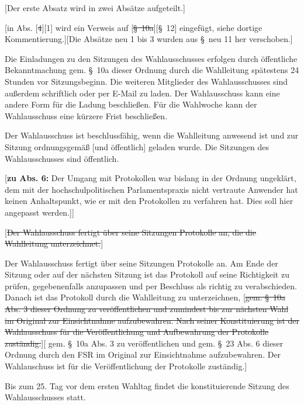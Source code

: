 \documentclass[%
draft,%
multilinesections%
]{fswo}
\newcommand\oldT[1]  {{\color{Gray}[\st{#1}]}}
\newcommand\newT[1]  {{\color{Green}[#1]}}
\newcommand\bemFr[1] {{\color{Red}[#1]}}
\newcommand\bemFe[1] {{\color{Cyan}[#1]}}
\newcommand\oldT[1]{}%
\newcommand\newT[1]{#1}
\newcommand\bemFr[1]{}%
\newcommand\bemFe[1]{}%
\newcommand\change[2]{\oldT{#1}\newT{#2}}
\begin{document}
\bemFe{Der erste Absatz wird in zwei Absätze aufgeteilt.}
\begin{contract}
\begin{addmargin}{1cm}
\bemFr{in Abs. \change{4}{1} wird ein Verweis auf \change{\S~10a}{\S~12} eingefügt, siehe dortige Kommentierung.}\bemFe{Die Absätze neu 1 bis 3 wurden aus \S~neu 11 her verschoben.}
\end{addmargin}

Die Einladungen zu den Sitzungen des Wahlausschusses erfolgen durch öffentliche Bekanntmachung gem. \S~10a dieser Ordnung durch die Wahlleitung spätestens 24 Stunden vor Sitzungsbeginn.
Die weiteren Mitglieder des Wahlausschusses sind außerdem schriftlich oder per E-Mail zu laden.
Der Wahlausschuss kann eine andere Form für die Ladung beschließen.
Für die Wahlwoche kann der Wahlausschuss eine kürzere Frist beschließen.

Der Wahlausschuss ist beschlussfähig, wenn die Wahlleitung anwesend ist und zur Sitzung ordnungsgemäß \newT{und öffentlich} geladen wurde.
Die Sitzungen des Wahlausschusses sind öffentlich.
%
\begin{addmargin}{1cm}
\bemFr{\textbf{zu Abs. 6:}
Der Umgang mit Protokollen war bislang in der Ordnung ungeklärt,
dem mit der hochschulpolitischen Parlamentspraxis nicht vertraute Anwender hat keinen Anhaltspunkt, wie er mit den Protokollen zu verfahren hat.
Dies soll hier angepasst werden.]}
\end{addmargin}
%
\oldT{Der Wahlausschuss fertigt über seine Sitzungen Protokolle an, die die Wahlleitung unterzeichnet.}

Der Wahlausschuss fertigt über seine Sitzungen Protokolle an.
Am Ende der Sitzung oder auf der nächsten Sitzung ist das Protokoll auf seine Richtigkeit zu prüfen, gegebenenfalls anzupassen und per Beschluss als richtig zu verabschieden.
Danach ist das Protokoll durch die Wahlleitung zu unterzeichnen,
\change{gem. \S~10a Abs. 3 dieser Ordnung zu veröffentlichen und zumindest bis zur nächsten Wahl im Original zur Einsichtnahme aufzubewahren.
Nach seiner Konstituierung ist der Wahlausschuss für die Veröffentlichung und Aufbewahrung der Protokolle zuständig.}{%
gem. \S~10a Abs. 3 zu veröffentlichen und gem. \S~23 Abs. 6 dieser Ordnung durch den FSR im Original zur Einsichtnahme aufzubewahren.
Der Wahlauschuss ist für die Veröffentlichung der Protokolle zuständig.}

Bis zum 25. Tag vor dem ersten Wahltag findet die konstituierende Sitzung des Wahlausschusses statt.


\end{contract}
\end{document}
